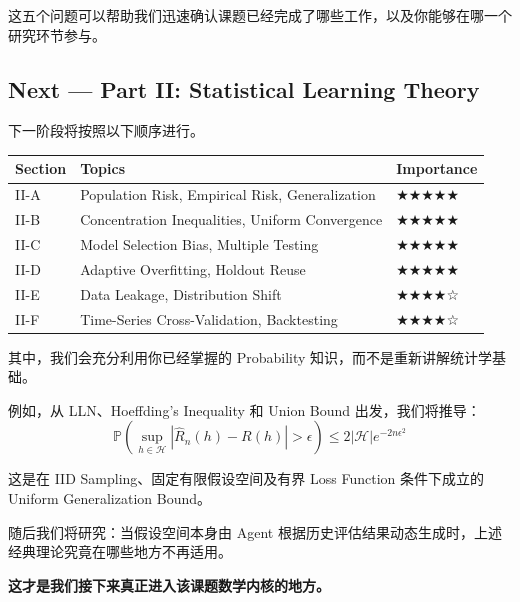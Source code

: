 这五个问题可以帮助我们迅速确认课题已经完成了哪些工作，以及你能够在哪一个研究环节参与。

\hypertarget{part-1-07-0001-next-part-ii-statistical-learning-theory}{%
\subsection{Next --- Part II: Statistical Learning Theory}\label{part-1-07-0001-next-part-ii-statistical-learning-theory}}

下一阶段将按照以下顺序进行。

\begin{readertable}
\begin{longtable}[]{@{}
  >{\raggedright\arraybackslash}p{}
  >{\raggedright\arraybackslash}p{}
  >{\raggedright\arraybackslash}p{}@{}}
\toprule
Section & Topics & Importance \\
\midrule
\endhead
II-A & Population Risk, Empirical Risk, Generalization & ★★★★★ \\
II-B & Concentration Inequalities, Uniform Convergence & ★★★★★ \\
II-C & Model Selection Bias, Multiple Testing & ★★★★★ \\
II-D & Adaptive Overfitting, Holdout Reuse & ★★★★★ \\
II-E & Data Leakage, Distribution Shift & ★★★★☆ \\
II-F & Time-Series Cross-Validation, Backtesting & ★★★★☆ \\
\bottomrule
\end{longtable}
\end{readertable}

其中，我们会充分利用你已经掌握的 Probability 知识，而不是重新讲解统计学基础。

例如，从 LLN、Hoeffding's Inequality 和 Union Bound 出发，我们将推导：
\[\boxed{
\mathbb P
\left(
\sup_{h\in\mathcal H}
\left|
\widehat R_n(h)-R(h)
\right|>\epsilon
\right)
\leq
2|\mathcal H|e^{-2n\epsilon^2}
}\]

这是在 IID Sampling、固定有限假设空间及有界 Loss Function 条件下成立的 Uniform Generalization Bound。

随后我们将研究：当假设空间本身由 Agent 根据历史评估结果动态生成时，上述经典理论究竟在哪些地方不再适用。

\textbf{这才是我们接下来真正进入该课题数学内核的地方。}
